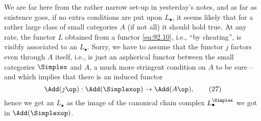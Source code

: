 We are far here from the rather narrow set-up in yesterday's notes,
and as far as existence goes, if no extra conditions are put upon
$L_\bullet$, it seems likely that for a rather large class of small
categories $A$ (if not all) it should hold true. At any rate, the
functor $L$ obtained from a functor \eqref{eq:92.10}, i.e., ``by
cheating'', is visibly associated to an $L_\bullet$. Sorry, we have to
assume that the functor $j$ factors even through $A$ itself, i.e., is
just an aspherical functor between the small categories $\Simplex$ and
$A$, a much more stringent condition on $A$ to be sure -- and which
implies that there is an induced functor
\begin{equation}
  \label{eq:92.27}
  \Add(j\op):\Add(\Simplexop)\to\Add(A\op),\tag{27}
\end{equation}
hence we get an $L_\bullet$ as the image of the canonical chain
complex $L_\bullet^\Simplex$ we got in $\Add(\Simplexop)$.

\bigbreak
\presectionfill{}\par


